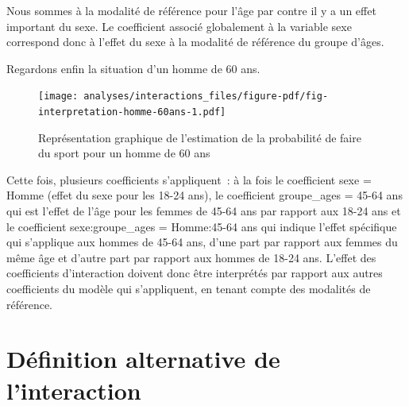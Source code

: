 \documentclass[
  letterpaper,
  DIV=11,
  numbers=noendperiod,
  oneside]{scrreprt}
\newenvironment{Shaded}{\begin{snugshade}}{\end{snugshade}}
\newcommand{\AttributeTok}[1]{\textcolor[rgb]{0.40,0.45,0.13}{#1}}
\newcommand{\DecValTok}[1]{\textcolor[rgb]{0.68,0.00,0.00}{#1}}
\newcommand{\FloatTok}[1]{\textcolor[rgb]{0.68,0.00,0.00}{#1}}
\newcommand{\FunctionTok}[1]{\textcolor[rgb]{0.28,0.35,0.67}{#1}}
\newcommand{\NormalTok}[1]{\textcolor[rgb]{0.00,0.23,0.31}{#1}}
\newcommand{\OtherTok}[1]{\textcolor[rgb]{0.00,0.23,0.31}{#1}}
\newcommand{\SpecialCharTok}[1]{\textcolor[rgb]{0.37,0.37,0.37}{#1}}
\newcommand{\StringTok}[1]{\textcolor[rgb]{0.13,0.47,0.30}{#1}}
\begin{document}
Nous sommes à la modalité de référence pour l'âge par contre il y a un
effet important du sexe. Le coefficient associé globalement à la
variable sexe correspond donc à l'effet du sexe à la modalité de
référence du groupe d'âges.

Regardons enfin la situation d'un homme de 60 ans.

\begin{Shaded}
\end{Shaded}

\begin{figure}[H]

{\centering \texttt{[image: analyses/interactions\_files/figure-pdf/fig-interpretation-homme-60ans-1.pdf]}

}

\caption{\label{fig-interpretation-homme-60ans}Représentation graphique
de l'estimation de la probabilité de faire du sport pour un homme de 60
ans}

\end{figure}

Cette fois, plusieurs coefficients s'appliquent~: à la fois le
coefficient sexe = Homme (effet du sexe pour les 18-24 ans), le
coefficient groupe\_ages = 45-64 ans qui est l'effet de l'âge pour les
femmes de 45-64 ans par rapport aux 18-24 ans et le coefficient
sexe:groupe\_ages = Homme:45-64 ans qui indique l'effet spécifique qui
s'applique aux hommes de 45-64 ans, d'une part par rapport aux femmes du
même âge et d'autre part par rapport aux hommes de 18-24 ans. L'effet
des coefficients d'interaction doivent donc être interprétés par rapport
aux autres coefficients du modèle qui s'appliquent, en tenant compte des
modalités de référence.

\hypertarget{duxe9finition-alternative-de-linteraction}{%
\section{Définition alternative de
l'interaction}\label{duxe9finition-alternative-de-linteraction}}
\end{document}
